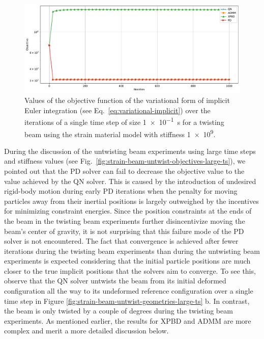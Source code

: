 \begin{figure}[h]
    \includegraphics[width=\textwidth]{figures/strain_beam_twist_typical_objectives.pdf}
    \caption{Values of the objective function of the variational form of implicit Euler integration (see Eq.\ \ref{eq:variational-implicit}) over the iterations of 
        a single time step of size \SI{1e-1}{\second} for a twisting beam using the strain material model with stiffness \num{1e9}.}
    \label{fig:strain-beam-twist-typical-objectives}
\end{figure}

During the discussion of the untwisting beam experiments using large time steps and stiffness values (see Fig.\ \ref{fig:strain-beam-untwist-objectives-large-ts}),
we pointed out that the PD solver can fail to decrease the objective value to the value achieved by the QN solver. This is caused by the introduction of 
undesired rigid-body motion during early PD iterations when the penalty for moving particles away from their inertial positions is largely outweighed by the incentives 
for minimizing constraint energies. Since the position constraints at the ends of the beam in the twisting beam experiments further disincentivize moving the beam's 
center of gravity, it is not surprising that this failure mode of the PD solver is not encountered. The fact that convergence is achieved after fewer iterations 
during the twisting beam experiments than during the untwisting beam experiments is expected considering that the initial particle positions are much closer to the true 
implicit positions that the solvers aim to converge. To see this, observe that the QN solver untwists the beam from its initial deformed configuration all the way to its 
undeformed reference configuration over a single time step in Figure \ref{fig:strain-beam-untwist-geometries-large-ts} b. In contrast, the beam is only twisted by a 
couple of degrees during the twisting beam experiments. As mentioned earlier, the results for XPBD and ADMM are more complex and merit a more detailed discussion below.

